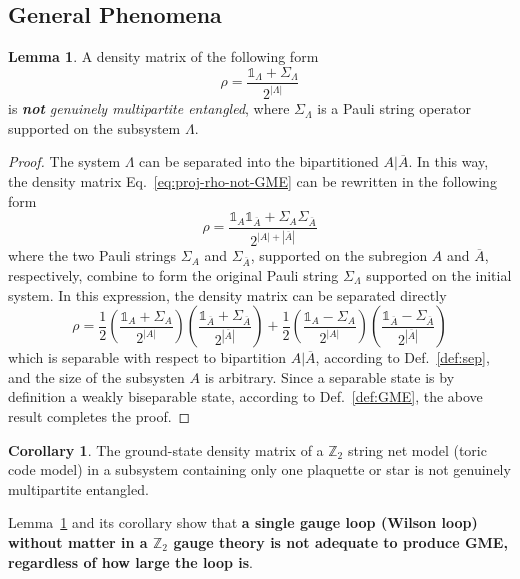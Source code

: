 \documentclass[12font]{article}
\theoremstyle{definition}
\newtheorem{lemma}[theorem]{Lemma}
\newtheorem{corollary}{Corollary}[theorem]
\newcommand{\lr}[1]{\left(  #1  \right)}
\newcommand{\abs}[1]{\left|  #1  \right|}
\begin{document}
\subsection{General Phenomena}
\begin{lemma}\label{lemma:single-stabilizer-generator}
    A density matrix of the following form
    \begin{equation}\label{eq:proj-rho-not-GME}
        \rho = \frac{\mathds{1}_\Lambda + \Sigma_\Lambda}{2^{\abs{\Lambda}}}
    \end{equation}
    is \textit{\textbf{not} genuinely multipartite entangled}, where $\Sigma_{\Lambda}$ is a Pauli string operator supported on the subsystem $\Lambda$.
\end{lemma}
\begin{proof}
    The system $\Lambda$ can be separated into the bipartitioned $A|\overline{A}$. In this way, the density matrix Eq.~\eqref{eq:proj-rho-not-GME} can be rewritten in the following form 
    \[
    \rho = \frac{\mathds{1}_A\mathds{1}_{\overline{A}} + \Sigma_A\Sigma_{\overline{A}}}{2^{\abs{A}+\abs{\overline{A}}}}
    \]
    where the two Pauli strings $\Sigma_{A}$ and $\Sigma_{\overline{A}}$, supported on the subregion $A$ and $\overline{A}$, respectively, combine to form the original Pauli string $\Sigma_{\Lambda}$ supported on the initial system. In this expression, the density matrix can be separated directly
    \[
    \rho 
    = 
    \frac{1}{2}
    \lr{\frac{\mathds{1}_A + \Sigma_A}{2^{\abs{A}}}}
    \lr{
    \frac{\mathds{1}_{\overline{A}} + \Sigma_{\overline{A}}}{2^{\abs{\overline{A}}}}
    }
    +
    \frac{1}{2}
    \lr{\frac{\mathds{1}_A - \Sigma_A}{2^{\abs{A}}}}
    \lr{
    \frac{\mathds{1}_{\overline{A}} - \Sigma_{\overline{A}}}{2^{\abs{\overline{A}}}}
    }
    \]
    which is separable with respect to bipartition $A|\overline{A}$, according to Def.~\ref{def:sep}, and the size of the subsysten $A$ is arbitrary. Since a separable state is by definition a weakly biseparable state, according to Def.~\ref{def:GME}, the above result completes the proof. 
\end{proof}

\begin{corollary}\label{cor:single-generator}
    The ground-state density matrix of a $\mathbb{Z}_2$ string net model (toric code model) in a subsystem containing only one plaquette or star is not genuinely multipartite entangled.
\end{corollary}
Lemma~\ref{lemma:single-stabilizer-generator} and its corollary show that \textbf{a single gauge loop (Wilson loop) without matter in a $\mathbb{Z}_2$ gauge theory is not adequate to produce GME, regardless of how large the loop is}. 
\end{document}
